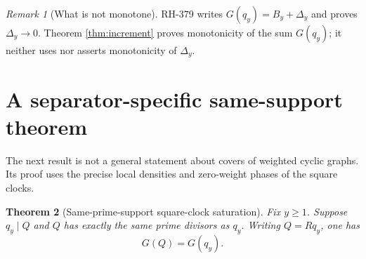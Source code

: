 \documentclass[11pt]{article}
\newtheorem{theorem}{Theorem}[section]
\theoremstyle{definition}
\theoremstyle{remark}
\newtheorem{remark}[theorem]{Remark}
\begin{document}
\begin{remark}[What is not monotone]
RH-379 writes $G(q_y)=B_y+\Delta_y$ and proves $\Delta_y\to0$.  Theorem
\ref{thm:increment} proves monotonicity of the sum $G(q_y)$; it neither uses
nor asserts monotonicity of $\Delta_y$.
\end{remark}

\section{A separator-specific same-support theorem}

The next result is not a general statement about covers of weighted cyclic
graphs.  Its proof uses the precise local densities and zero-weight phases
of the square clocks.

\begin{theorem}[Same-prime-support square-clock saturation]
\label{thm:saturation}
Fix $y\ge1$.  Suppose $q_y\mid Q$ and $Q$ has exactly the same prime
divisors as $q_y$.  Writing $Q=Rq_y$, one has
\begin{equation}
                         \boxed{G(Q)=G(q_y).}
 \label{eq:saturation}
\end{equation}
\end{theorem}
\end{document}
